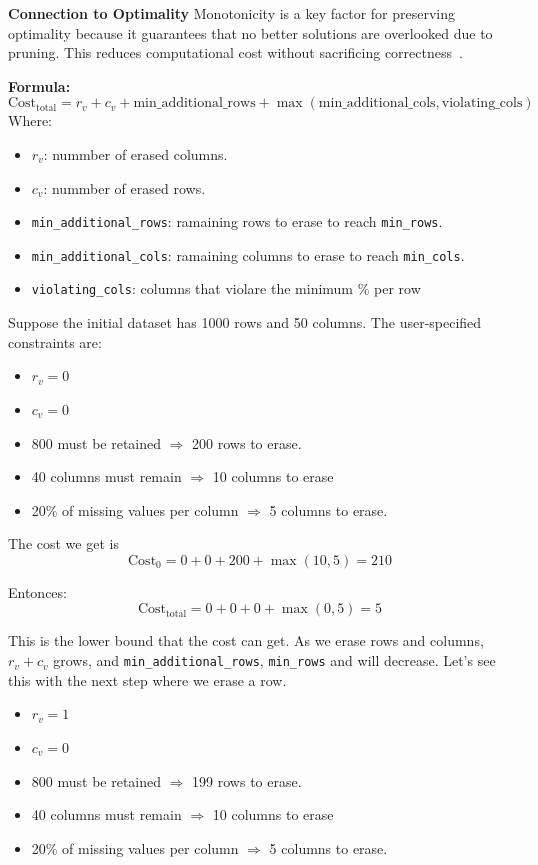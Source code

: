 \documentclass[a4paper,12pt]{article}
\begin{document}
\textbf{Connection to Optimality}  
Monotonicity is a key factor for preserving optimality because it guarantees that no better solutions are overlooked due to pruning. This reduces computational cost without sacrificing correctness~\cite{34}.

\textbf{Formula:}
\[
\text{Cost}_{\text{total}} = r_v + c_v + \text{min\_additional\_rows} + \max(\text{min\_additional\_cols}, \text{violating\_cols})
\]
Where:
\begin{itemize}
    \item $r_v$: nummber of erased columns.
    \item $c_v$: nummber of erased rows.
    \item \texttt{min\_additional\_rows}: ramaining rows to erase to reach \texttt{min\_rows}.
    \item \texttt{min\_additional\_cols}: ramaining columns to erase to reach \texttt{min\_cols}.
    \item \texttt{violating\_cols}: columns that violare the minimum \% per row
\end{itemize}

Suppose the initial dataset has 1000 rows and 50 columns. The user-specified constraints
are: 
\begin{itemize}
    \item $r_v = 0$
    \item $c_v = 0$
    \item 800 must be retained $\Rightarrow$ 200 rows to erase.
    \item 40 columns must remain $\Rightarrow$ 10 columns to erase
    \item 20\% of missing values per column $\Rightarrow$ 5 columns to erase.
\end{itemize}

The cost we get is 
\[
\text{Cost}_{\text{0}} = 0 + 0 +200 + \max(10, 5) = 210
\]

Entonces:
\[
\text{Cost}_{\text{total}} = 0 + 0 + 0 + \max(0, 5) = 5
\]

This is the lower bound that the cost can get. As we erase rows and columns, $r_v + c_v$ grows, and \texttt{min\_additional\_rows}, \texttt{min\_rows} and  will decrease. Let's see this with the next step where we erase a row. 

\begin{itemize}
    \item $r_v = 1$
    \item $c_v = 0$
    \item 800 must be retained $\Rightarrow$ 199 rows to erase.
    \item 40 columns must remain $\Rightarrow$ 10 columns to erase
    \item 20\% of missing values per column $\Rightarrow$ 5 columns to erase.
\end{itemize}
\end{document}
